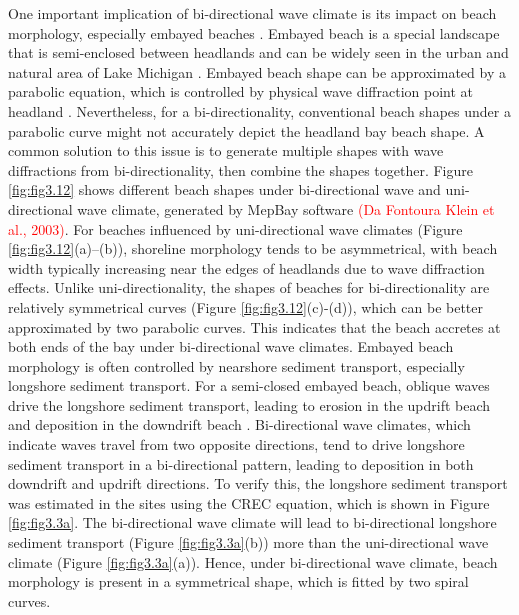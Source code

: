 One important implication of bi-directional wave climate is its impact on beach morphology, especially embayed beaches \citep{wiggins_coastal_2019,wiggins_regionally-coherent_2019}. Embayed beach is a special landscape that is semi-enclosed between headlands and can be widely seen in the urban and natural area of Lake Michigan \citep{mattheus_great_2022}. Embayed beach shape can be approximated by a parabolic equation, which is controlled by physical wave diffraction point at headland \citep{moreno_equilibrium_1999}. Nevertheless, for a bi-directionality, conventional beach shapes under a parabolic curve might not accurately depict the headland bay beach shape. A common solution to this issue is to generate multiple shapes with wave diffractions from bi-directionality, then combine the shapes together. Figure \ref{fig:fig3.12} shows different beach shapes under bi-directional wave and uni-directional wave climate, generated by MepBay software \textcolor{red}{(Da Fontoura Klein et al., 2003)}. For beaches influenced by uni-directional wave climates (Figure \ref{fig:fig3.12}(a)–(b)), shoreline morphology tends to be asymmetrical, with beach width typically increasing near the edges of headlands due to wave diffraction effects. Unlike uni-directionality, the shapes of beaches for bi-directionality are relatively symmetrical curves (Figure \ref{fig:fig3.12}(c)-(d)), which can be better approximated by two parabolic curves. This indicates that the beach accretes at both ends of the bay under bi-directional wave climates. Embayed beach morphology is often controlled by nearshore sediment transport, especially longshore sediment transport. For a semi-closed embayed beach, oblique waves drive the longshore sediment transport, leading to erosion in the updrift beach and deposition in the downdrift beach \citep{moreno_equilibrium_1999,loureiro_24_2020}. Bi-directional wave climates, which indicate waves travel from two opposite directions, tend to drive longshore sediment transport in a bi-directional pattern, leading to deposition in both downdrift and updrift directions. To verify this, the longshore sediment transport was estimated in the sites using the CREC equation, which is shown in Figure \ref{fig:fig3.3a}. The bi-directional wave climate will lead to bi-directional longshore sediment transport (\eg Figure \ref{fig:fig3.3a}(b)) more than the uni-directional wave climate (\eg Figure \ref{fig:fig3.3a}(a)). Hence, under bi-directional wave climate, beach morphology is present in a symmetrical shape, which is fitted by two spiral curves. 

